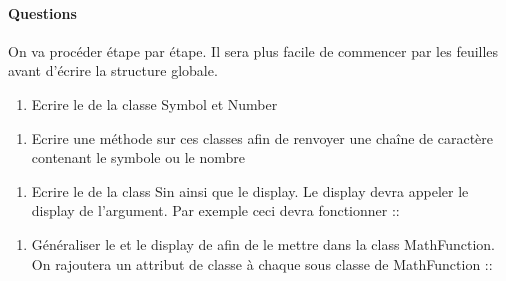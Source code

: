 \documentclass[letterpaper,10pt,english]{sphinxhowto}
\begin{document}
\paragraph{Questions}
\label{\detokenize{cours6_objet_exercices:questions}}
\sphinxAtStartPar
On va procéder étape par étape. Il sera plus facile de commencer par les feuilles avant d’écrire la structure globale.
\begin{enumerate}
%
\item {} 
\sphinxAtStartPar
Ecrire le  de la classe Symbol et Number

\end{enumerate}
\begin{enumerate}
%
\setcounter{enumi}{1}
\item {} 
\sphinxAtStartPar
Ecrire une méthode  sur ces classes afin de renvoyer une chaîne de caractère contenant le symbole ou le nombre

\end{enumerate}
\begin{enumerate}
%
\setcounter{enumi}{2}
\item {} 
\sphinxAtStartPar
Ecrire le  de la class Sin ainsi que le display. Le display devra appeler le display de l’argument. Par exemple ceci devra fonctionner ::

\end{enumerate}

\begin{sphinxVerbatim}[commandchars=\\\{\}]
  
\end{sphinxVerbatim}
\begin{enumerate}
%
\setcounter{enumi}{3}
\item {} 
\sphinxAtStartPar
Généraliser le  et le display de  afin de le mettre dans la class MathFunction. On rajoutera un attribut de classe à chaque sous classe de MathFunction ::

\end{enumerate}
\end{document}
